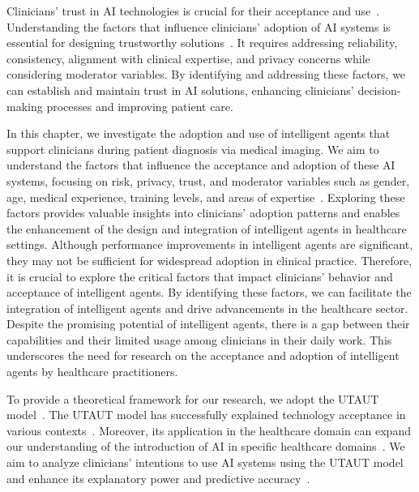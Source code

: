 Clinicians' trust in \ac{AI} technologies is crucial for their acceptance and use~\cite{calisto2019midaaiarfuv, https://doi.org/10.13140/rg.2.2.25412.68486}.
Understanding the factors that influence clinicians' adoption of \ac{AI} systems is essential for designing trustworthy solutions~\cite{JUNGMANN2021834, doi:10.1200/CCI.20.00148, info:doi/10.2196/12422}.
It requires addressing reliability, consistency, alignment with clinical expertise, and privacy concerns while considering moderator variables.
By identifying and addressing these factors, we can establish and maintain trust in \ac{AI} solutions, enhancing clinicians' decision-making processes and improving patient care.

In this chapter, we investigate the adoption and use of intelligent agents that support clinicians during patient diagnosis via medical imaging.
We aim to understand the factors that influence the acceptance and adoption of these \ac{AI} systems, focusing on risk, privacy, trust, and moderator variables such as gender, age, medical experience, training levels, and areas of expertise~\cite{CALISTO2021102607, Kocielnik:2019:YAI:3290605.3300641}.
Exploring these factors provides valuable insights into clinicians' adoption patterns and enables the enhancement of the design and integration of intelligent agents in healthcare settings.
Although performance improvements in intelligent agents are significant, they may not be sufficient for widespread adoption in clinical practice.
Therefore, it is crucial to explore the critical factors that impact clinicians' behavior and acceptance of intelligent agents.
By identifying these factors, we can facilitate the integration of intelligent agents and drive advancements in the healthcare sector.
Despite the promising potential of intelligent agents, there is a gap between their capabilities and their limited usage among clinicians in their daily work.
This underscores the need for research on the acceptance and adoption of intelligent agents by healthcare practitioners.

To provide a theoretical framework for our research, we adopt the \ac{UTAUT} model~\cite{venkatesh2016unified}.
The \ac{UTAUT} model has successfully explained technology acceptance in various contexts~\cite{10.2307/30036540, KIJSANAYOTIN2009404}.
Moreover, its application in the healthcare domain can expand our understanding of the introduction of \ac{AI} in specific healthcare domains~\cite{KALAVANI2018287}.
We aim to analyze clinicians' intentions to use \ac{AI} systems using the \ac{UTAUT} model and enhance its explanatory power and predictive accuracy~\cite{DEANGELI2020102412, HART201993, Zhang2022}.

